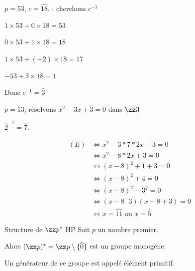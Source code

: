 \begin{exemple}
    $p = 53$, $c = \widehat{18}$. : cherchons $c^{-1}$

    $1\times 53 + 0 \times 18 = 53$
    
    $0 \times 53 + 1 \times 18 = 18$

    $1 \times 53 + (-2) \times 18 = 17$

    $- 53 + 3 \times 18 = 1$ 

    Donc $c^{-1} = \widehat{3} $

    \lvspace $p = 13$, résolvons $x^2 - 3x + \widehat 3 = 0$ dans $\zz 3$

    $\widehat 2^{-1} = \widehat 7$. 

    \begin{align*}
        (E) & \Leftrightarrow x^2 - 3 *7*2x + 3 = 0 \\
        & \Leftrightarrow x^2 - 8 * 2x + 3 = 0 \\
        & \Leftrightarrow (x - 8)^2 + 1 + 3 = 0 \\
        & \Leftrightarrow (x - 8)^2 + 4 = 0 \\
        & \Leftrightarrow (x - 8)^2 - 3^2 = 0 \\
        & \Leftrightarrow (x - 8^- 3)(x - 8 + 3) = 0 \\
        & \Leftrightarrow x = \widehat {11} \text{ ou } x = \widehat {5}
    \end{align*}

\end{exemple}


\begin{theoreme}{Structure de $\zz p ^*$ HP}{}
    Soit $p$ un nombre premier. 

    Alors $(\zz p)^* = \zz p \setminus \{\widehat 0\}$ est un groupe monogène. 

    Un générateur de ce groupe est appelé élément primitif. 
\end{theoreme}


